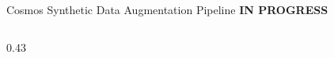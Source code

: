 \documentclass[aspectratio=169,11pt]{beamer}
\begin{document}
\begin{frame}{Cosmos Synthetic Data Augmentation Pipeline
  \hfill\colorbox{gold!20}{\scriptsize\textcolor{gold!80!black}{\textbf{IN PROGRESS}}}}
\begin{columns}[T]
\begin{column}{0.43\textwidth}
\end{column}
\end{columns}

\end{frame}
\end{document}
